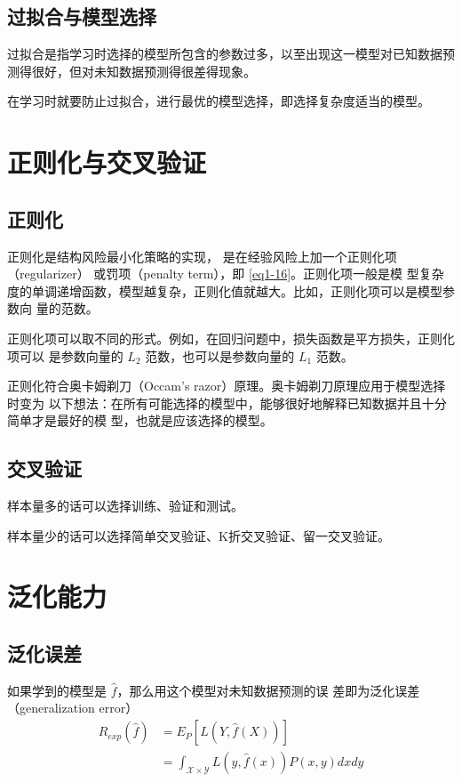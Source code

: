 \subsection{过拟合与模型选择}
\begin{definition}[过拟合]
    过拟合是指学习时选择的模型所包含的参数过多，以至出现这一模型对已知数据预测得很好，但对未知数据预测得很差得现象。
\end{definition}

在学习时就要防止过拟合，进行最优的模型选择，即选择复杂度适当的模型。
\section{正则化与交叉验证}
\subsection{正则化}
\begin{definition}[正则化]
    正则化是结构风险最小化策略的实现，
    是在经验风险上加一个正则化项（regularizer） 或罚项（penalty term），即 \autoref{eq1-16}。正则化项一般是模
    型复杂度的单调递增函数，模型越复杂，正则化值就越大。比如，正则化项可以是模型参数向
    量的范数。
\end{definition}

正则化项可以取不同的形式。例如，在回归问题中，损失函数是平方损失，正则化项可以
是参数向量的 $L_2$ 范数，也可以是参数向量的 $L_1$ 范数。

正则化符合奥卡姆剃刀（Occam’s razor）原理。奥卡姆剃刀原理应用于模型选择时变为
以下想法：在所有可能选择的模型中，能够很好地解释已知数据并且十分简单才是最好的模
型，也就是应该选择的模型。
\subsection{交叉验证}
样本量多的话可以选择训练、验证和测试。

样本量少的话可以选择简单交叉验证、K折交叉验证、留一交叉验证。
\section{泛化能力}
\subsection{泛化误差}
\begin{definition}[泛化误差]
    如果学到的模型是 $\hat{f}$，那么用这个模型对未知数据预测的误
    差即为泛化误差（generalization error）
    \begin{equation}
        \begin{aligned}
            R_{exp}(\hat{f}) & = E_P[L(Y,\hat{f}(X))]                                         \\
                             & = \int_{\mathcal{X}\times\mathcal{Y}}L(y,\hat{f}(x))P(x,y)dxdy \\
        \end{aligned}
    \end{equation}
\end{definition}


